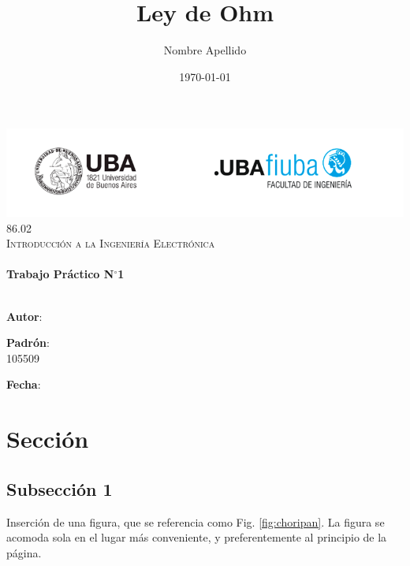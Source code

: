 \documentclass[12pt]{article}
\title{Ley de Ohm}	            %
\author{Nombre Apellido}		%
\date{\today}					%
\makeatletter
\newcommand{\padron}{105509}    %
\newcommand{\tpnumber}{1}       %
\let\thetitle\@title
\let\theauthor\@author
\let\thedate\@date
\makeatother
\begin{document}
\begin{titlepage}
    \includegraphics[scale = 0.75]{img/logofiuba.png}\\[1.0 cm]	    %
    \centering
	\textsc{\Large 86.02}\\[0.2 cm]
	\textsc{\large Introducción a la Ingeniería Electrónica}\\[4 cm]
	\textcolor{cyan}{{\fontsize{40}{60}\selectfont \bfseries \thetitle}}\\[0.5cm]
	{ \Large \bfseries Trabajo Práctico N$^\circ$\tpnumber}\\[5cm]
	
	
    \noindent\makebox[\linewidth]{\rule{\textwidth}{0.4pt}}\\[0.5cm]
    \begin{minipage}{.4\textwidth}
    \textbf{Autor}:\\
    \theauthor
    \end{minipage}%
    \begin{minipage}{.4\textwidth}
    \textbf{Padrón}:\\
    \padron
    \end{minipage}%
    \begin{minipage}{.2\textwidth}
    \textbf{Fecha}:\\
    \thedate
    \end{minipage}
 
	\vfill
	
\end{titlepage}




\section{Sección}

\subsection{Subsección 1}
Inserción de una figura, que se referencia como Fig. \ref{fig:choripan}. La figura se acomoda sola en el lugar más conveniente, y preferentemente al principio de la página. %
\end{document}
